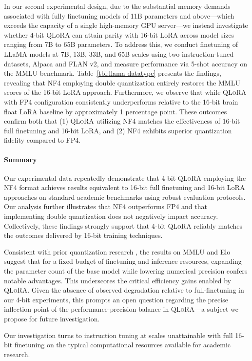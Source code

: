 In our second experimental design, due to the substantial memory demands associated with fully finetuning models of 11B parameters and above—which exceeds the capacity of a single high-memory GPU server—we instead investigate whether 4-bit \textsc{QLoRA} can attain parity with 16-bit LoRA across model sizes ranging from 7B to 65B parameters. To address this, we conduct finetuning of LLaMA models at 7B, 13B, 33B, and 65B scales using two instruction-tuned datasets, Alpaca and FLAN v2, and measure performance via 5-shot accuracy on the MMLU benchmark. Table~\ref{tbl:llama-datatype} presents the findings, revealing that NF4 employing double quantization entirely restores the MMLU scores of the 16-bit LoRA approach. Furthermore, we observe that while \textsc{QLoRA} with FP4 configuration consistently underperforms relative to the 16-bit brain float LoRA baseline by approximately 1 percentage point. These outcomes confirm both that (1) \textsc{QLoRA} utilizing NF4 matches the effectiveness of 16-bit full finetuning and 16-bit LoRA, and (2) NF4 exhibits superior quantization fidelity compared to FP4.

\paragraph{Summary} Our experimental data repeatedly demonstrate that 4-bit \textsc{QLoRA} employing the NF4 format achieves results equivalent to 16-bit full finetuning and 16-bit LoRA approaches on standard academic benchmarks using robust evaluation protocols. Our analysis further illustrates that NF4 outperforms FP4 and that implementing double quantization does not negatively impact accuracy. Collectively, these findings strongly support that 4-bit \textsc{QLoRA} reliably matches the outcomes delivered by 16-bit training techniques.

Consistent with prior quantization research \citep{dettmers2022case}, the results on MMLU and Elo suggest that for a fixed budget of finetuning and inference resources, expanding the parameter count of the base model while lowering numerical precision confers notable advantages. This underscores the critical efficiency gains enabled by \textsc{QLoRA}. Given the absence of observed degradation relative to full-finetuning in our 4-bit experiments, this prompts an open question regarding the precise inflection point of the performance-precision balance in \textsc{QLoRA}—a subject we propose for future investigation.

Our investigation turns to instruction tuning at scales unattainable with full 16-bit finetuning on the typical computational resources available for academic research.

